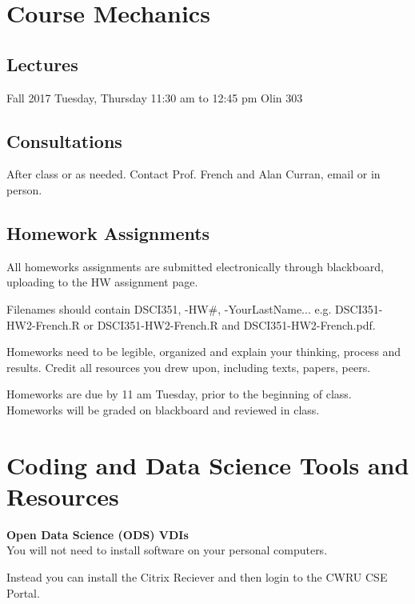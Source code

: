 \documentclass[11pt]{article} %
\begin{document}
\section{Course Mechanics}

  \subsection{Lectures}
  
    Fall 2017 	Tuesday, Thursday 11:30 am to 12:45 pm		Olin 303
  
  \subsection{Consultations}
  
    After class or as needed. Contact Prof. French and Alan Curran, email or in person. 
  
  \subsection{Homework Assignments}
  
    All homeworks assignments are submitted electronically through blackboard, uploading to the HW assignment page. 
  
    Filenames should contain DSCI351, -HW\#, -YourLastName... e.g. DSCI351-HW2-French.R or DSCI351-HW2-French.R and DSCI351-HW2-French.pdf. 
  
    Homeworks need to be legible, organized and explain your thinking, process and results. 
    Credit all resources you drew upon, including texts, papers, peers. 
  
    Homeworks are due by 11 am Tuesday, prior to the beginning of class. 
    Homeworks will be graded on blackboard and reviewed in class. 


\section{Coding and Data Science Tools and Resources}

  {\bf Open Data Science (ODS) VDIs} \\
  
    You will not need to install software on your personal computers. 
    
    Instead you can install the Citrix Reciever \cite{citrix_citrix_2014} and then login to the CWRU CSE Portal. \cite{cse_portal_cwru_2014} 
    
\end{document}
